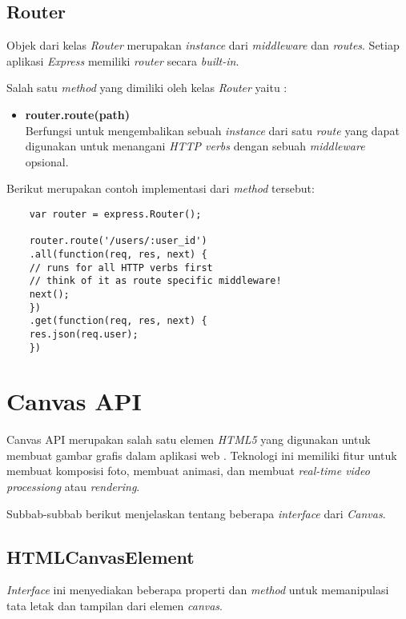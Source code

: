\subsection{Router}
Objek dari kelas \textit{Router} merupakan \textit{instance} dari \textit{middleware} dan \textit{routes}. Setiap aplikasi \textit{Express} memiliki \textit{router} secara \textit{built-in}. 

Salah satu \textit{method} yang dimiliki oleh kelas \textit{Router} yaitu : 

\begin{itemize}
	\item \textbf{router.route(path)} \\ Berfungsi untuk mengembalikan sebuah \textit{instance} dari satu \textit{route} yang dapat digunakan untuk menangani \textit{HTTP verbs} dengan sebuah \textit{middleware} opsional.
	
\end{itemize}

Berikut merupakan contoh implementasi dari \textit{method} tersebut:

\begin{lstlisting}
	var router = express.Router();
	
	router.route('/users/:user_id')
	.all(function(req, res, next) {
	// runs for all HTTP verbs first
	// think of it as route specific middleware!
	next();
	})
	.get(function(req, res, next) {
	res.json(req.user);
	})
\end{lstlisting}


\section{Canvas API}
\label{sec:Canvas API}
 
Canvas API merupakan salah satu elemen \textit{HTML5} yang digunakan untuk membuat gambar grafis dalam aplikasi web \cite{canvas}. Teknologi ini memiliki fitur untuk membuat komposisi foto, membuat animasi, dan membuat \textit{real-time video processiong} atau \textit{rendering}. 

Subbab-subbab berikut menjelaskan tentang beberapa \textit{interface} dari \textit{Canvas}.

\subsection{HTMLCanvasElement}
\textit{Interface} ini menyediakan beberapa properti dan \textit{method} untuk memanipulasi tata letak dan tampilan dari elemen \textit{canvas}.

